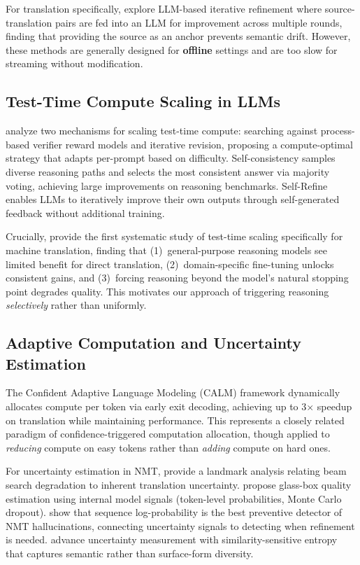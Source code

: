 For translation specifically, \citet{dou2024iterative} explore LLM-based iterative refinement where source-translation pairs are fed into an LLM for improvement across multiple rounds, finding that providing the source as an anchor prevents semantic drift. However, these methods are generally designed for \textbf{offline} settings and are too slow for streaming without modification.

\subsection{Test-Time Compute Scaling in LLMs}

\citet{snell2024scaling} analyze two mechanisms for scaling test-time compute: searching against process-based verifier reward models and iterative revision, proposing a compute-optimal strategy that adapts per-prompt based on difficulty. Self-consistency \citep{wang2023selfconsistency} samples diverse reasoning paths and selects the most consistent answer via majority voting, achieving large improvements on reasoning benchmarks. Self-Refine \citep{madaan2023selfrefine} enables LLMs to iteratively improve their own outputs through self-generated feedback without additional training.

Crucially, \citet{li2025tts_mt} provide the first systematic study of test-time scaling specifically for machine translation, finding that (1)~general-purpose reasoning models see limited benefit for direct translation, (2)~domain-specific fine-tuning unlocks consistent gains, and (3)~forcing reasoning beyond the model's natural stopping point degrades quality. This motivates our approach of triggering reasoning \emph{selectively} rather than uniformly.

\subsection{Adaptive Computation and Uncertainty Estimation}

The Confident Adaptive Language Modeling (CALM) framework \citep{schuster2022calm} dynamically allocates compute per token via early exit decoding, achieving up to 3$\times$ speedup on translation while maintaining performance. This represents a closely related paradigm of confidence-triggered computation allocation, though applied to \emph{reducing} compute on easy tokens rather than \emph{adding} compute on hard ones.

For uncertainty estimation in NMT, \citet{ott2018analyzing} provide a landmark analysis relating beam search degradation to inherent translation uncertainty. \citet{fomicheva2020unsupervised} propose glass-box quality estimation using internal model signals (token-level probabilities, Monte Carlo dropout). \citet{guerreiro2023hallucinations} show that sequence log-probability is the best preventive detector of NMT hallucinations, connecting uncertainty signals to detecting when refinement is needed. \citet{cheng2024entropy} advance uncertainty measurement with similarity-sensitive entropy that captures semantic rather than surface-form diversity.

